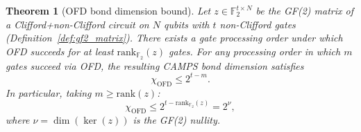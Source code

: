 \documentclass[a4paper,twocolumn,11pt]{quantumarticle}
\newtheorem{theorem}{Theorem}
\begin{document}
\begin{theorem}[OFD bond dimension bound]
\label{thm:bond_dim}
Let $z \in \mathbb{F}_2^{t \times N}$ be the GF(2) matrix of a Clifford+non-Clifford circuit on $N$ qubits with $t$ non-Clifford gates (Definition~\ref{def:gf2_matrix}).
There exists a gate processing order under which OFD succeeds for at least $\mathrm{rank}_{\mathbb{F}_2}(z)$ gates.
For any processing order in which $m$ gates succeed via OFD, the resulting CAMPS bond dimension satisfies
\begin{equation}
\label{eq:bond_bound}
\chi_{\mathrm{OFD}} \le 2^{t - m}.
\end{equation}
In particular, taking $m \ge \mathrm{rank}(z)$:
\begin{equation}
\label{eq:bond_bound_rank}
\chi_{\mathrm{OFD}} \le 2^{t - \mathrm{rank}_{\mathbb{F}_2}(z)} = 2^{\nu},
\end{equation}
where $\nu = \dim(\ker(z))$ is the GF(2) nullity.
\end{theorem}
\end{document}
